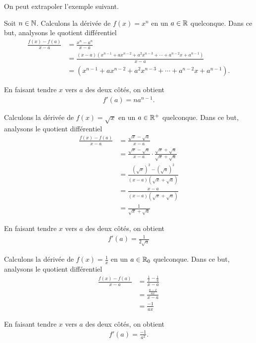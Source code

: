\documentclass[main.tex]{subfiles}
\begin{document}
On peut extrapoler l'exemple suivant.

\begin{example}
    [Dérivée de $x^n$]

    Soit $n \in \mathbb{N}$.
    Calculons la dérivée de $f(x) = x^n$ en un $a \in \mathbb{R}$ quelconque.
    Dans ce but,
    analysons le quotient différentiel
    \begin{align}
        \frac {f(x) - f(a)}{x - a}
        &= \frac {x^n - a^n}{x - a}\\
        &= \frac {(x-a)(x^{n-1} + ax^{n-2} + a^2x^{n-3} + \cdots + a^{n-2}x + a^{n-1})}{x - a}\\
        &= (x^{n-1} + ax^{n-2} + a^2x^{n-3} + \cdots + a^{n-2}x + a^{n-1}).
    \end{align}

    En faisant tendre $x$ vers $a$ des deux côtés,
    on obtient
    \begin{align}
        f'(a) = na^{n-1}.
    \end{align}
\end{example}

\begin{example}

    Calculons la dérivée de $f(x) = \sqrt x$ en un $a \in \mathbb{R}^+$ quelconque.
    Dans ce but,
    analysons le quotient différentiel
    \begin{align}
        \frac {f(x) - f(a)}{x - a}
        &= \frac {\sqrt x - \sqrt a}{x - a}\\
        &= \frac {\sqrt x - \sqrt a}{x - a} \cdot \frac{\sqrt x + \sqrt a}{\sqrt x + \sqrt a}\\
        &= \frac {{(\sqrt x)}^2 - {(\sqrt a)}^2}{(x - a) (\sqrt x + \sqrt a)}\\
        &= \frac {x - a} {(x - a) (\sqrt x + \sqrt a)}\\
        &= \frac 1 {\sqrt x + \sqrt a}
    \end{align}

    En faisant tendre $x$ vers $a$ des deux côtés,
    on obtient
    \begin{align}
        f'(a) = \frac 1 {2 \sqrt a}
    \end{align}
\end{example}

\begin{example}

    Calculons la dérivée de $f(x) = \frac 1 x$ en un $a \in \mathbb{R}_0$ quelconque.
    Dans ce but,
    analysons le quotient différentiel
    \begin{align}
        \frac {f(x) - f(a)} {x - a}
        &= \frac {\frac 1 x - \frac 1 a}{x - a}\\
        &= \frac{\frac{a - x}{ax}}{x - a}\\
        &= \frac {-1}{ax}
    \end{align}

    En faisant tendre $x$ vers $a$ des deux côtés,
    on obtient
    \begin{align}
        f'(a) = \frac {-1} {a^2}.
    \end{align}
\end{example}
\end{document}

